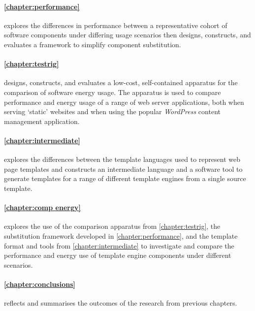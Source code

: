 \paragraph{\autoref{chapter:performance}} explores the differences in performance between a representative cohort of software components under differing usage scenarios then designs, constructs, and evaluates a framework to simplify component substitution.

\paragraph{\autoref{chapter:testrig}} designs, constructs, and evaluates a low-cost, self-contained apparatus for the comparison of software energy usage. The apparatus is used to compare performance and energy usage of a range of web server applications, both when serving `static' websites and when using the popular \emph{WordPress} content management application.

\paragraph{\autoref{chapter:intermediate}} explores the differences between the template languages used to represent web page templates and constructs an intermediate language and a software tool to generate templates for a range of different template engines from a single source template.

\paragraph{\autoref{chapter:comp energy}} explores the use of the comparison apparatus from \autoref{chapter:testrig}, the substitution framework developed in \autoref{chapter:performance}, and the template format and tools from \autoref{chapter:intermediate} to investigate and compare the performance and energy use of template engine components under different scenarios.

\paragraph{\autoref{chapter:conclusions}} reflects and summarises the outcomes of the research from previous chapters.